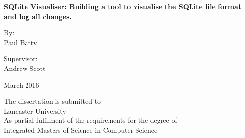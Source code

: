 \begin{titlepage}
	\begin{center}
		\begin{huge}
			\textbf{SQLite Visualiser: Building a tool to visualise the SQLite file format and log all changes.}
		\end{huge}	
		
		
		\vspace{2cm}		
		
		\normalsize By:   \\
		\large Paul Batty
		
		\vspace{2.5cm}
		
		\normalsize Supervisor: \\
		\large Andrew Scott
		
		\vspace{1.5cm}
		
		\large March 2016
		
		\vfill 
		
		\normalsize
		The dissertation is submitted to \\
		Lancaster University \\
		As partial fulfilment of the requirements for the degree of \\
		Integrated Masters of Science in Computer Science \\
	\end{center} 
\end{titlepage}
